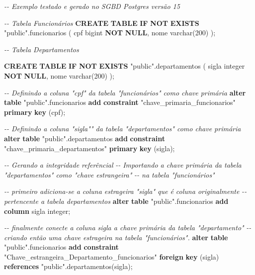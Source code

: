 \documentclass[
]{book}
\newenvironment{Shaded}{\begin{snugshade}}{\end{snugshade}}
\newcommand{\CommentTok}[1]{\textcolor[rgb]{0.56,0.35,0.01}{\textit{#1}}}
\newcommand{\ControlFlowTok}[1]{\textcolor[rgb]{0.13,0.29,0.53}{\textbf{#1}}}
\newcommand{\DataTypeTok}[1]{\textcolor[rgb]{0.13,0.29,0.53}{#1}}
\newcommand{\DecValTok}[1]{\textcolor[rgb]{0.00,0.00,0.81}{#1}}
\newcommand{\KeywordTok}[1]{\textcolor[rgb]{0.13,0.29,0.53}{\textbf{#1}}}
\newcommand{\NormalTok}[1]{#1}
\newcommand{\OtherTok}[1]{\textcolor[rgb]{0.56,0.35,0.01}{#1}}
\begin{document}
\begin{Shaded}
\begin{Highlighting}[]
\CommentTok{{-}{-} Exemplo testado e gerado no SGBD Postgres versão 15}

\CommentTok{{-}{-} Tabela Funcionários}
\KeywordTok{CREATE} \KeywordTok{TABLE} \ControlFlowTok{IF} \KeywordTok{NOT} \KeywordTok{EXISTS} \OtherTok{"public"}\NormalTok{.funcionarios}
\NormalTok{(}
\NormalTok{    cpf bigint }\KeywordTok{NOT} \KeywordTok{NULL}\NormalTok{,}
\NormalTok{    nome }\DataTypeTok{varchar}\NormalTok{(}\DecValTok{200}\NormalTok{)}
\NormalTok{);}

\CommentTok{{-}{-} Tabela Departamentos}

\KeywordTok{CREATE} \KeywordTok{TABLE} \ControlFlowTok{IF} \KeywordTok{NOT} \KeywordTok{EXISTS} \OtherTok{"public"}\NormalTok{.departamentos}
\NormalTok{(}
\NormalTok{    sigla }\DataTypeTok{integer} \KeywordTok{NOT} \KeywordTok{NULL}\NormalTok{,}
\NormalTok{    nome }\DataTypeTok{varchar}\NormalTok{(}\DecValTok{200}\NormalTok{)}
\NormalTok{);}

\CommentTok{{-}{-} Definindo a coluna "cpf" da tabela "funcionários" como chave primária}
\KeywordTok{alter} \KeywordTok{table} \OtherTok{"public"}\NormalTok{.funcionarios }\KeywordTok{add} \KeywordTok{constraint} \OtherTok{"chave\_primaria\_funcionarios"} \KeywordTok{primary} \KeywordTok{key}\NormalTok{ (cpf);}

\CommentTok{{-}{-} Definindo a coluna "sigla"" da tabela "departamentos" como chave primária}
\KeywordTok{alter} \KeywordTok{table} \OtherTok{"public"}\NormalTok{.departamentos }\KeywordTok{add} \KeywordTok{constraint} \OtherTok{"chave\_primaria\_departamentos"} \KeywordTok{primary} \KeywordTok{key}\NormalTok{ (sigla);}

\CommentTok{{-}{-} Gerando a integridade referêncial }
\CommentTok{{-}{-} Importando a chave primária da tabela "departamentos" como "chave estrangeira"}
\CommentTok{{-}{-} na tabela "funcionários"}

\CommentTok{{-}{-} primeiro adiciona{-}se a coluna estrageira "sigla" que é coluna originalmente }
\CommentTok{{-}{-} pertencente a tabela departamentos}
\KeywordTok{alter} \KeywordTok{table} \OtherTok{"public"}\NormalTok{.funcionarios }\KeywordTok{add} \KeywordTok{column}\NormalTok{ sigla }\DataTypeTok{integer}\NormalTok{;}

\CommentTok{{-}{-} finalmente conecte a coluna sigla a chave primária da tabela "departamento"}
\CommentTok{{-}{-} criando então uma chave estrageira na tabela "funcionários".}
\KeywordTok{alter} \KeywordTok{table} \OtherTok{"public"}\NormalTok{.funcionarios }\KeywordTok{add} \KeywordTok{constraint} \OtherTok{"Chave\_estrangeira\_Departamento\_funcionarios"} \KeywordTok{foreign} \KeywordTok{key}\NormalTok{ (sigla) }\KeywordTok{references} \OtherTok{"public"}\NormalTok{.departamentos(sigla);}
\end{Highlighting}
\end{Shaded}
\end{document}
